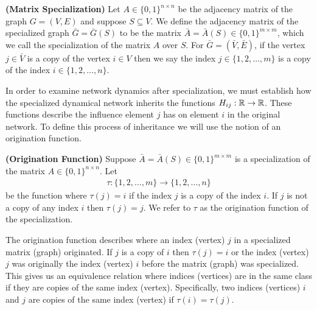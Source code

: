 \documentclass[12pt]{thesis}
\begin{document}

\begin{definition}\label{def:matspec}\textbf{(Matrix Specialization)}
Let $A\in\{0,1\}^{n\times n}$ be the adjacency matrix of the graph $G=(V,E)$ and suppose $S\subseteq V$.
We define the adjacency matrix of the specialized graph $\bar{G}=\bar{G}(S)$ to be the matrix $\bar{A}=\bar{A}(S)\in\{0,1\}^{m\times m}$, which we call the {specialization} of the matrix $A$ over $S$.
For $\bar{G}=(\bar{V},\bar{E})$, if the vertex $j\in\bar{V}$ is a copy of the vertex $i\in V$ then we say the index $j\in\{1,2,\dots,m\}$ is a {copy} of the index $i\in\{1,2,\dots,n\}$.
\end{definition}

In order to examine network dynamics after specialization, we must establish how the specialized dynamical network inherits the functions $H_{ij}:\mathbb{R} \to \mathbb{R}$.
These functions describe the influence element $j$ has on element $i$ in the original network.
To define this process of inheritance we will use the notion of an origination function.  

\begin{definition}\label{def:orig}\textbf{(Origination Function)}
Suppose $\bar{A}=\bar{A}(S)\in\{0,1\}^{m\times m}$ is a specialization of the matrix $A\in\{0,1\}^{n\times n}$.
Let 
\begin{align*}
    \tau:\{1,2,\dots,m\}\rightarrow \{1,2,\dots,n\}
\end{align*}
be the function where $\tau(j)=i$ if the index $j$ is a copy of the index $i$.
If $j$ is not a copy of any index $i$ then $\tau(j)=j$.
We refer to $\tau$ as the {origination function} of the specialization.
\end{definition}

The origination function describes where an index (vertex) $j$ in a specialized matrix (graph) {originated}.
If $j$ is a copy of $i$ then $\tau(j)=i$ or the index (vertex) $j$ was originally the index (vertex) $i$ before the matrix (graph) was specialized.
This gives us an equivalence relation where indices (vertices) are in the same class if they are copies of the same index (vertex).
Specifically, two indices (vertices) $i$ and $j$ are {copies of the same index (vertex)} if $\tau(i)=\tau(j)$.
\end{document}
